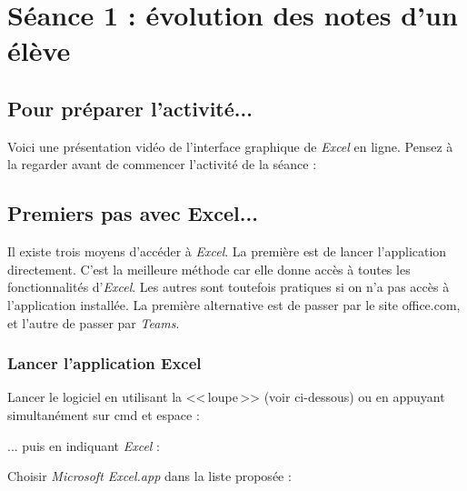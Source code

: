\newpage


\section{Séance 1 : évolution des notes d'un élève}


\subsection{Pour préparer l'activité...}

Voici une présentation vidéo de l'interface graphique de \emph{Excel} en ligne. Pensez à la regarder avant de commencer l'activité de la séance :

\begin{center}
\end{center}



\subsection{Premiers pas avec Excel...}

Il existe trois moyens d'accéder à \emph{Excel}. La première est de lancer l'application directement. C'est la meilleure méthode car elle donne accès à toutes les fonctionnalités d'\emph{Excel}. Les autres sont toutefois pratiques si on n'a pas accès à l'application installée. La première alternative est de passer par le site office.com, et l'autre de passer par \emph{Teams}.

\subsubsection{Lancer l'application Excel}

Lancer le logiciel en utilisant la <<\,loupe\,>> (voir ci-dessous) ou en appuyant simultanément sur cmd et espace :


... puis en indiquant \emph{Excel} :


Choisir \emph{Microsoft Excel.app} dans la liste proposée :


